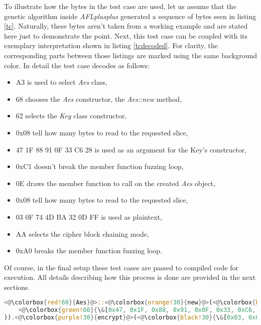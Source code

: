 To illustrate how the bytes in the test case are used, let us assume that the genetic algorithm inside \textit{AFLplusplus} generated a sequence of bytes seen in listing \ref{tc}. Naturally, these bytes aren't taken from a working example and are stated here just to demonstrate the point. Next, this test case can be coupled with its exemplary interpretation shown in listing \ref{tcdecoded}. For clarity, the corresponding parts between those listings are marked using the same background color. In detail the test case decodes as follows:
\begin{itemize}
    \item \colorbox{red!60}{A3} is used to select \textit{Aes} class,
    \item \colorbox{orange!30}{68} chooses the \textit{Aes} constructor, the \textit{Aes::new} method,
    \item \colorbox{blue!30}{62} selects the \textit{Key} class constructor,
    \item \colorbox{green!75}{0x08} tell how many bytes to read to the requested slice,
    \item \colorbox{green!60}{47 1F 88 91 0F 33 C6 28} is used as an argument for the Key's constructor,
    \item \colorbox{brown!30}{0xC1} doesn't break the member function fuzzing loop,
    \item \colorbox{purple!30}{0E} draws the member function to call on the created \textit{Aes} object,
    \item \colorbox{black!45}{0x08} tell how many bytes to read to the requested slice,
    \item \colorbox{black!30}{03 0F 74 4D BA 32 0D FF} is used as plaintext,
    \item \colorbox{yellow!60}{AA} selects the cipher block chaining mode,
    \item \colorbox{brown!60}{0xA0} breaks the member function fuzzing loop.
\end{itemize}
Of course, in the final setup these test cases are passed to compiled code for execution. All details describing how this process is done are provided in the next sections. 

\begin{minipage}{\linewidth}
\begin{lstlisting}[language=rust,caption={Example of interpreted test case},label={tcdecoded}]
<@\colorbox{red!60}{Aes}@>::<@\colorbox{orange!30}{new}@>(<@\colorbox{blue!30}{Key::new}@>(
    <@\colorbox{green!60}{\&[0x47, 0x1F, 0x88, 0x91, 0x0F, 0x33, 0xC6, 0x28]}@>
)).<@\colorbox{purple!30}{encrypt}@>(<@\colorbox{black!30}{\&[0x03, 0x0F, 0x74, 0x4D, 0xBA, 0x32, 0x0D, 0xFF]}@>, <@\colorbox{yellow!60}{AesMode::CBC}@>)
\end{lstlisting}
\end{minipage}

